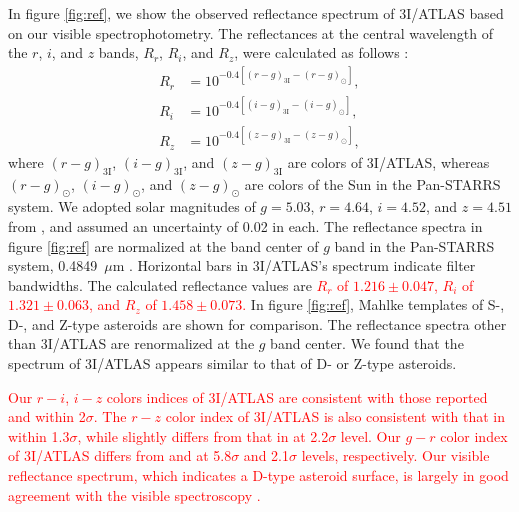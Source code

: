 \documentclass[]{pasj02}
\newcommand{\RED}[1]{\textcolor{red}{#1}}
\newcommand\I{3I/ATLAS\xspace}
\begin{document}
In figure \ref{fig:ref}, we show the observed reflectance spectrum of \I based on our visible spectrophotometry.
The reflectances at the central wavelength of the $r$, $i$, and $z$ bands, 
$R_r$, $R_i$, and $R_z$, were calculated as follows \citep[e.g.,][]{DeMeo2013}:
\begin{eqnarray}
    R_r &= 10^{-0.4[(r-g)_{\mathrm{3I}}-(r-g)_\odot]}, \\
    R_i &= 10^{-0.4[(i-g)_{\mathrm{3I}}-(i-g)_\odot]}, \\
    R_z &= 10^{-0.4[(z-g)_{\mathrm{3I}}-(z-g)_\odot]}, 
\end{eqnarray}
where 
$(r-g)_\mathrm{3I}$, $(i-g)_\mathrm{3I}$, and $(z-g)_\mathrm{3I}$ 
are colors of \I,
whereas
$(r-g)_\odot$, $(i-g)_\odot$, and $(z-g)_\odot$ 
are colors of the Sun in the Pan-STARRS system.
We adopted solar magnitudes of $g = 5.03$, $r = 4.64$, $i = 4.52$, and $z = 4.51$ from
\citet{Willmer2018}, and assumed an uncertainty of 0.02 in each.
The reflectance spectra in figure \ref{fig:ref} are normalized at the band center of $g$ band in the Pan-STARRS system, 0.4849~$\mu$m \citep{Willmer2018}.
Horizontal bars in \I's spectrum indicate filter bandwidths.
The calculated reflectance values are 
\RED{
    $R_r$ of $1.216\pm0.047$, $R_i$ of $1.321\pm0.063$, and $R_z$ of $1.458\pm0.073$.
    }
In figure \ref{fig:ref}, Mahlke templates of S-, D-, and Z-type asteroids \citep{Mahlke2022} are shown for comparison.
The reflectance spectra other than \I are renormalized at the $g$ band center.
We found that the spectrum of \I appears similar to that of D- or Z-type asteroids.

\RED{
    Our $r-i$, $i-z$ colors indices of \I are 
    consistent with those reported 
    \cite{Seligman2025_3I} and \cite{Bolin2025_3I} within 2$\sigma$.
    The $r-z$ color index of \I is also consistent with that in \cite{Seligman2025_3I} within 1.3$\sigma$, 
    while slightly differs from that in \citet{Bolin2025_3I} at 2.2$\sigma$ level. 
    Our $g-r$ color index of \I differs from 
    \cite{Seligman2025_3I} and \cite{Bolin2025_3I} at 5.8$\sigma$ and 2.1$\sigma$ levels, respectively.
    Our visible reflectance spectrum, which indicates a D-type asteroid surface, is largely in good agreement with the visible spectroscopy \citep{Seligman2025_3I, Opitom2025_3I, Marcos2025_3I, Yang2025_3I}.
}
\end{document}
